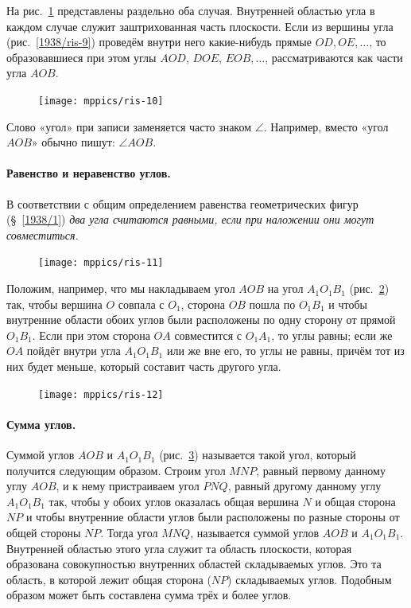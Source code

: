 \documentclass[oneside]{book}
\begin{document}
На рис.~\ref{1938/ris-10} представлены раздельно оба случая.
Внутренней областью угла в каждом случае служит заштрихованная часть плоскости.
Если из вершины угла (рис.~\ref{1938/ris-9}) проведём внутри него какие-нибудь прямые $OD, OE,\dots$, то образовавшиеся при этом углы $AOD$, $DOE$, $EOB,\dots$, рассматриваются как части угла $AOB$.

\begin{figure}[h!]
\centering
\texttt{[image: mppics/ris-10]}
\caption{}\label{1938/ris-10}
\end{figure}

Слово «угол» при записи заменяется часто знаком $\angle$.
Например, вместо «угол $AOB$» обычно пишут:
$\angle AOB$.

\paragraph{Равенство и неравенство углов.}\label{1938/14}
В соответствии с общим определением равенства геометрических фигур (§~\ref{1938/1}) \emph{два угла считаются равными, если при наложении они могут совместиться.}

\begin{figure}[h]
\centering
\texttt{[image: mppics/ris-11]}
\caption{}\label{1938/ris-11}
\end{figure}

Положим, например, что мы накладываем угол $AOB$ на угол $A_1O_1B_1$ (рис.~\ref{1938/ris-11}) так, чтобы вершина $O$ совпала с $O_1$, сторона $OB$ пошла по $O_1B_1$ и чтобы внутренние области обоих углов были расположены по одну сторону от прямой $O_1B_1$.
Если при этом сторона $OA$ совместится с $O_1A_1$, то углы равны;
если же $OA$ пойдёт внутри угла $A_1O_1B_1$ или же вне его, то углы не равны, причём тот из них будет меньше, который составит часть другого угла.

\begin{figure}[h!]
\centering
\texttt{[image: mppics/ris-12]}
\caption{}\label{1938/ris-12}
\end{figure}

\paragraph{Сумма углов.}\label{1938/15}
Суммой углов $AOB$ и $A_1O_1B_1$ (рис.~\ref{1938/ris-12}) называется такой угол, который получится следующим образом.
Строим угол $MNP$, равный первому данному углу $AOB$, и к нему пристраиваем угол $PNQ$, равный другому данному углу $A_1O_1B_1$ так, чтобы у обоих углов оказалась общая вершина $N$ и общая сторона $NP$ и чтобы внутренние области углов были расположены по разные стороны от общей стороны $NP$.
Тогда угол $MNQ$, называется суммой углов $AOB$ и $A_1O_1B_1$.
Внутренней областью этого угла служит та область плоскости, которая образована совокупностью внутренних областей складываемых углов.
Это та область, в которой лежит общая сторона ($NP$) складываемых углов.
Подобным образом может быть составлена сумма трёх и более углов.
\end{document}
